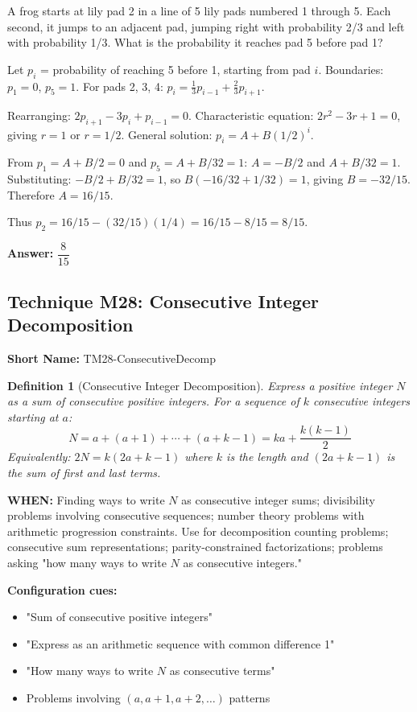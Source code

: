 \documentclass[12pt]{article}
\newtheorem{definition}{Definition}[section]
\newenvironment{problem}[1]
{\begin{tcolorbox}[colback=blue!5!white,colframe=blue!75!black,title={#1}]}{\end{tcolorbox}}
\newenvironment{solution}
{\begin{tcolorbox}[colback=green!5!white,colframe=green!75!black,title={Solution}]}{\end{tcolorbox}}
\begin{document}
\begin{problem}{AMC Style: Biased Walk}
A frog starts at lily pad 2 in a line of 5 lily pads numbered 1 through 5. Each second, it jumps to an adjacent pad, jumping right with probability 2/3 and left with probability 1/3. What is the probability it reaches pad 5 before pad 1?
\end{problem}

\begin{solution}
Let $p_i$ = probability of reaching 5 before 1, starting from pad $i$.
Boundaries: $p_1 = 0$, $p_5 = 1$.
For pads 2, 3, 4: $p_i = \frac{1}{3}p_{i-1} + \frac{2}{3}p_{i+1}$.

Rearranging: $2p_{i+1} - 3p_i + p_{i-1} = 0$.
Characteristic equation: $2r^2 - 3r + 1 = 0$, giving $r = 1$ or $r = 1/2$.
General solution: $p_i = A + B(1/2)^i$.

From $p_1 = A + B/2 = 0$ and $p_5 = A + B/32 = 1$:
$A = -B/2$ and $A + B/32 = 1$.
Substituting: $-B/2 + B/32 = 1$, so $B(-16/32 + 1/32) = 1$, giving $B = -32/15$.
Therefore $A = 16/15$.

Thus $p_2 = 16/15 - (32/15)(1/4) = 16/15 - 8/15 = 8/15$.

\textbf{Answer:} $\dfrac{8}{15}$
\end{solution}

\subsection{Technique M28: Consecutive Integer Decomposition}
\textbf{Short Name:} TM28-ConsecutiveDecomp

\begin{definition}[Consecutive Integer Decomposition]
Express a positive integer $N$ as a sum of consecutive positive integers. For a sequence of $k$ consecutive integers starting at $a$:
\[
N = a + (a+1) + \cdots + (a+k-1) = ka + \frac{k(k-1)}{2}
\]
Equivalently: $2N = k(2a + k - 1)$ where $k$ is the length and $(2a + k - 1)$ is the sum of first and last terms.
\end{definition}

\textbf{WHEN:} Finding ways to write $N$ as consecutive integer sums; divisibility problems involving consecutive sequences; number theory problems with arithmetic progression constraints. Use for decomposition counting problems; consecutive sum representations; parity-constrained factorizations; problems asking "how many ways to write $N$ as consecutive integers."

\textbf{Configuration cues:}
\begin{itemize}
    \item "Sum of consecutive positive integers"
    \item "Express as an arithmetic sequence with common difference 1"
    \item "How many ways to write $N$ as consecutive terms"
    \item Problems involving $(a, a+1, a+2, \ldots)$ patterns
\end{itemize}
\end{document}
